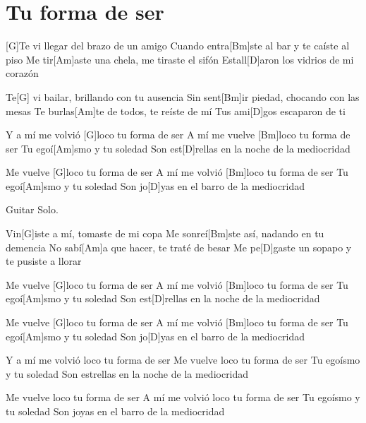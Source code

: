 \section{Tu forma de ser}

\noindent
\chordG
\chordBm
\chordAm
\chordD 

\vspace{1cm}

\begin{guitar}


\begin{multicols}{2}

	[G]Te vi llegar del brazo de un amigo
	Cuando entra[Bm]ste al bar y te caíste al piso
	Me tir[Am]aste una chela, me tiraste el sifón
	Estall[D]aron los vidrios de mi corazón

	Te[G] vi bailar, brillando con tu ausencia
	Sin sent[Bm]ir piedad, chocando con las mesas
	Te burlas[Am]te de todos, te reíste de mí
	Tus ami[D]gos escaparon de ti


	\vspace{0.3cm}

	Y a mí me volvió [G]loco tu forma de ser
	A mí me vuelve [Bm]loco tu forma de ser
	Tu egoí[Am]smo y tu soledad
	Son est[D]rellas en la noche de la mediocridad

	Me vuelve [G]loco tu forma de ser
	A mí me volvió [Bm]loco tu forma de ser
	Tu egoí[Am]smo y tu soledad
	Son jo[D]yas en el barro de la mediocridad


	\vspace{0.3cm}

	Guitar Solo.


	\vspace{0.3cm}

	Vin[G]iste a mí, tomaste de mi copa
	Me sonreí[Bm]ste así, nadando en tu demencia
	No sabí[Am]a que hacer, te traté de besar
	Me pe[D]gaste un sopapo y te pusiste a llorar

	\vspace{0.3cm}

	Me vuelve [G]loco tu forma de ser
	A mí me volvió [Bm]loco tu forma de ser
	Tu egoí[Am]smo y tu soledad
	Son est[D]rellas en la noche de la mediocridad

	Me vuelve [G]loco tu forma de ser
	A mí me volvió [Bm]loco tu forma de ser
	Tu egoí[Am]smo y tu soledad
	Son jo[D]yas en el barro de la mediocridad

	\vspace{0.3cm}

	Y a mí me volvió loco tu forma de ser
	Me vuelve loco tu forma de ser
	Tu egoísmo y tu soledad
	Son estrellas en la noche de la mediocridad

	Me vuelve loco tu forma de ser
	A mí me volvió loco tu forma de ser
	Tu egoísmo y tu soledad
	Son joyas en el barro de la mediocridad

\end{multicols}

\end{guitar}
